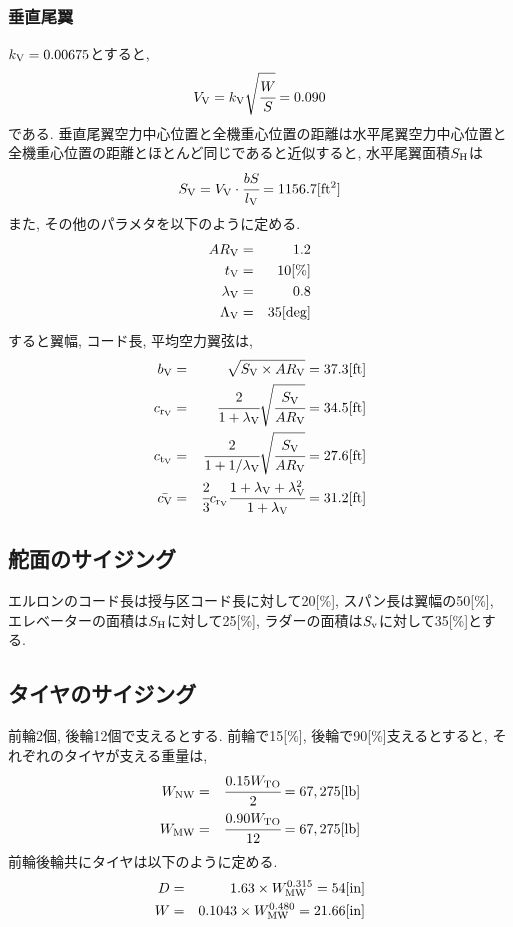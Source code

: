 \documentclass[12pt]{jsarticle}
\begin{document}
\subsubsection{垂直尾翼}
$k_{\rm V} = 0.00675$とすると,
\begin{eqnarray*}
V_{\rm V} = k_{\rm V}\sqrt{\cfrac{W}{S}} = 0.090
\end{eqnarray*}
である. 垂直尾翼空力中心位置と全機重心位置の距離は水平尾翼空力中心位置と全機重心位置の距離とほとんど同じであると近似すると, 水平尾翼面積$S_{\rm H}$は
\begin{eqnarray*}
S_{\rm V} = V_{\rm V} \cdot \cfrac{b S}{l_{\rm V}} = 1156.7 [\rm ft^2]
\end{eqnarray*}
また, その他のパラメタを以下のように定める.
\begin{eqnarray*}
AR_{\rm V} &=& 1.2 \\
t_{\rm V} &=& 10[\%] \\
\lambda_{\rm V} &=& 0.8 \\
\Lambda_{\rm V} &=& 35 [\rm deg]
\end{eqnarray*}
すると翼幅, コード長, 平均空力翼弦は,
\begin{eqnarray*}
b_{\rm V} &=& \sqrt{S_{\rm V} \times AR_{\rm V}} = 37.3 [\rm ft] \\
c_{\rm r_V} &=& \cfrac{2}{1+\lambda_{\rm V}}\sqrt{\cfrac{S_{\rm V}}{AR_{\rm V}}} = 34.5 [\rm ft] \\
c_{\rm t_V} &=& \cfrac{2}{1+1/\lambda_{\rm V}}\sqrt{\cfrac{S_{\rm V}}{AR_{\rm V}}} = 27.6 [\rm ft] \\
\bar{c_{\rm V}} &=& \cfrac{2}{3}c_{\rm r_V} \cfrac{1 + \lambda_{\rm V} + \lambda_{\rm V}^2}{1 + \lambda_{\rm V}} = 31.2 [\rm ft]
\end{eqnarray*}

\subsection{舵面のサイジング}
エルロンのコード長は授与区コード長に対して20[\%], スパン長は翼幅の50[\%], エレベーターの面積は$S_{\rm H}$に対して25[\%], ラダーの面積は$S_{\rm v}$に対して35[\%]とする.

\subsection{タイヤのサイジング}
前輪2個, 後輪12個で支えるとする. 前輪で15[\%], 後輪で90[\%]支えるとすると, それぞれのタイヤが支える重量は,
\begin{eqnarray*}
W_{\rm NW} &=& \cfrac{0.15W_{\rm TO}}{2} = 67,275 [\rm lb] \\
W_{\rm MW} &=& \cfrac{0.90W_{\rm TO}}{12} = 67,275 [\rm lb]
\end{eqnarray*}
前輪後輪共にタイヤは以下のように定める.
\begin{eqnarray*}
D &=& 1.63 \times W_{\rm MW}^{0.315} = 54[\rm in] \\
W &=& 0.1043 \times W_{\rm MW}^{0.480} = 21.66[\rm in]
\end{eqnarray*}
\end{document}
